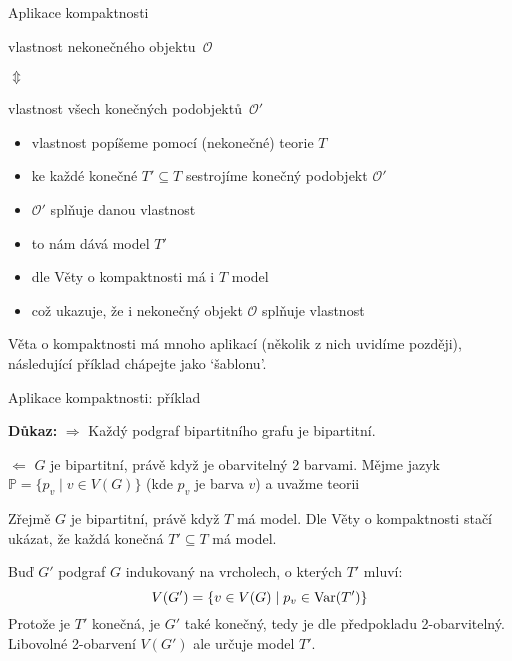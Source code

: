 \documentclass{beamer}
\begin{document}
\begin{frame}{Aplikace kompaktnosti}
     
    \begin{center}
        \alert{vlastnost nekonečného objektu~$\mathcal O$}
    
        $\Updownarrow$

        \alert{vlastnost všech konečných podobjektů~$\mathcal O'$}
    \end{center}
    
    \begin{itemize}
        \item vlastnost popíšeme pomocí (nekonečné) teorie $T$
        \item ke každé konečné $T'\subseteq T$ sestrojíme konečný podobjekt $\mathcal O'$
        \item $\mathcal O'$ splňuje danou vlastnost
        \item to nám dává model $T'$
        \item dle Věty o kompaktnosti má i $T$ model
        \item což ukazuje, že i nekonečný objekt $\mathcal O$ splňuje vlastnost
    \end{itemize}
     
    Věta o kompaktnosti má mnoho aplikací (několik z nich uvidíme později), následující příklad chápejte jako `šablonu'.

\end{frame}


\begin{frame}{Aplikace kompaktnosti: příklad}


    \textbf{Důkaz:} \alert{$\Rightarrow$} Každý podgraf bipartitního grafu je bipartitní. 
    
    \alert{$\Leftarrow$} $G$ je bipartitní, právě když je obarvitelný 2 barvami. Mějme jazyk $\mathbb P=\{p_v\mid v\in V(G)\}$ (kde $p_v$ je barva $v$) a uvažme teorii
    

    Zřejmě $G$ je bipartitní, právě když $T$ má model. Dle Věty o kompaktnosti stačí ukázat, že každá konečná $T'\subseteq T$ má model.
    
    Buď $G'$ podgraf $G$ indukovaný na vrcholech, o kterých $T'$ mluví:
    $$
    V(G')=\{v\in V(G)\mid p_v\in\operatorname{Var}(T')\}
    $$
    Protože je $T'$ konečná, je $G'$ také konečný, tedy je dle předpokladu 2-obarvitelný. Libovolné 2-obarvení $V(G')$ ale určuje model $T'$.\hfill\qedsymbol

\end{frame}
\end{document}
